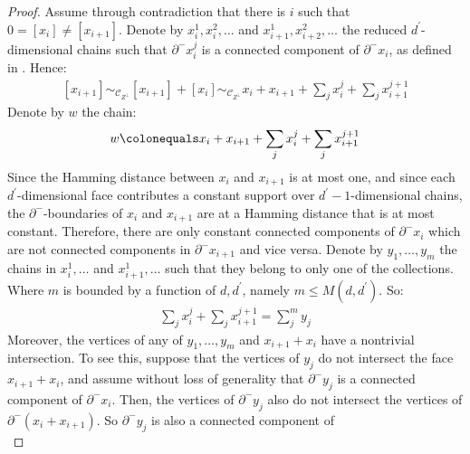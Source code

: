 \begin{proof}
  Assume through contradiction that there is $i$ such that $0 = [x_{i}] \neq [x_{i+1}]$. Denote by $x_{i}^{1}, x_{i}^{2}, \ldots$ and $x_{i+1}^{1}, x_{i+2}^{2}, \ldots$ the reduced $d^{\prime}$-dimensional chains such that $\partial^{-}x_{i}^{j}$ is a connected component of $\partial^{-}x_{i}$, as defined in . Hence:
  \begin{equation*}
    \begin{split}
      [x_{i+1}] \sim_{\mathcal{C}_{Z^{\perp}}} [x_{i+1}] + [x_{i}] \sim_{\mathcal{C}_{Z^{\perp}}}  x_{i} + x_{i+1} + \sum_{j}x_{i}^{j} + \sum_{j}x_{i+1}^{j+1}
    \end{split}
  \end{equation*}
Denote by $w$ the chain:
  \begin{equation*}
    \begin{split}
      w \colonequals x_{i} + x_{i+1} + \sum_{j}x_{i}^{j} + \sum_{j}x_{i+1}^{j+1}
    \end{split}
  \end{equation*}
  Since the Hamming distance between $x_{i}$ and $x_{i+1}$ is at most one, and since each $d^{\prime}$-dimensional face contributes a constant support over $d^{\prime}-1$-dimensional chains, the $\partial^{-}$-boundaries of $x_{i}$ and $x_{i+1}$ are at a Hamming distance that is at most constant. Therefore, there are only constant connected components of $\partial^{-}x_{i}$ which are not connected components in $\partial^{-}x_{i+1}$ and vice versa. Denote by $y_{1}, \ldots, y_{m}$ the chains in $x_{i}^{1}, \ldots$ and $x_{i+1}^{1}, \ldots$ such that they belong to only one of the collections. Where $m$ is bounded by a function of $d,d^{\prime}$, namely $m \le M(d,d^{\prime})$. So:
  \begin{equation*}
    \begin{split}
      \sum_{j}x_{i}^{j} + \sum_{j}x_{i+1}^{j+1} = \sum_{j}^{m}y_{j}
    \end{split}
  \end{equation*}
Moreover, the vertices of any of $y_{1}, \ldots, y_{m}$ and $x_{i+1}+x_{i}$ have a nontrivial intersection. To see this, suppose that the vertices of $y_{j}$ do not intersect the face $x_{i+1}+x_{i}$, and assume without loss of generality that $\partial^{-}y_{j}$ is a connected component of $\partial^{-}x_{i}$. Then, the vertices of $\partial^{-}y_{j}$ also do not intersect the vertices of $\partial^{-}(x_{i} + x_{i+1})$. So $\partial^{-}y_{j}$ is also a connected component of
  \begin{equation*}

\end{equation*}
\end{proof}
